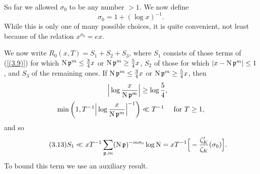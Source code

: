 \documentclass[./main]{subfiles}
\begin{document}
So far we allowed $\sigma_0$ to be any number $>1$. We now define
\[\tag{3.12} \label{(3.12)} \sigma_0=1+(\log x)^{-1}.\]
While this is only one of many possible choices, it is quite convenient, not least because of the relation $x^{\sigma_0}=ex$.

We now write $R_0(x,T)=S_1+S_2+S_3$, where $S_1$ consists of those terms of (\ref{(3.9)}) for which $\operatorname{N}\mathfrak{p}^m \le \frac{3}{4}x$ or $\operatorname{N}\mathfrak{p}^m \ge \frac{5}{4}x$, $S_2$ of those for which $|x-\operatorname{N}\mathfrak{p}^m|\le 1$, and $S_3$ of the remaining ones. If $\operatorname{N}\mathfrak{p}^m \le \frac{3}{4}x$ or $\operatorname{N}\mathfrak{p}^m\ge \frac{5}{4}x$, then
\begin{align*}
\Big|\log\frac{x}{\operatorname{N}\mathfrak{p}^m}\Big|&\ge \log\frac{5}{4},\\
\min\bigg(1, T^{-1}\Big|\log \frac{x}{\operatorname{N}\mathfrak{p}^m}\Big|^{-1}\bigg)&\ll T^{-1} \quad\text{ for } T\ge 1,
\end{align*}
and so
\[\tag{3.13}\label{(3.13)}
    S_1 \ll xT^{-1} \sum_{\mathfrak{p}, m} (\operatorname{N}\mathfrak{p})^{-m\sigma_0} \log \operatorname{N}
    = xT^{-1}\Big[-\frac{\zeta_K' }{\zeta_K}(\sigma_0)\Big].
\]
To bound this term we use an auxiliary result.
\end{document}

